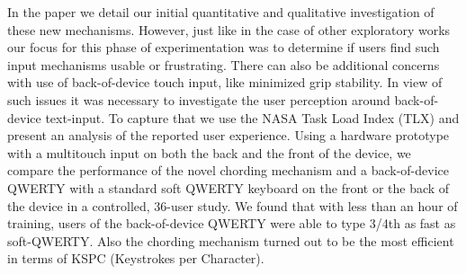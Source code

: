 In the paper we detail our initial quantitative and qualitative investigation of these new mechanisms. However, just like in the case of other exploratory works \cite{RearType} our focus for this phase of experimentation was to determine if users find such input mechanisms usable or frustrating. There can also be additional concerns with use of back-of-device touch input, like minimized grip stability. In view of such issues it was necessary to investigate the user perception around back-of-device text-input. To capture that we use the NASA Task Load Index (TLX) and present an analysis of the reported user experience. Using a hardware prototype with a multitouch input on both the back and the front of the device, we compare the performance of the novel chording mechanism and a back-of-device QWERTY with a standard soft QWERTY keyboard on the front or the back of the device in a controlled, 36-user study. We found that with less than an hour of training, users of the back-of-device QWERTY were able to type 3/4th as fast as soft-QWERTY. Also the chording mechanism turned out to be the most efficient in terms of KSPC (Keystrokes per Character).